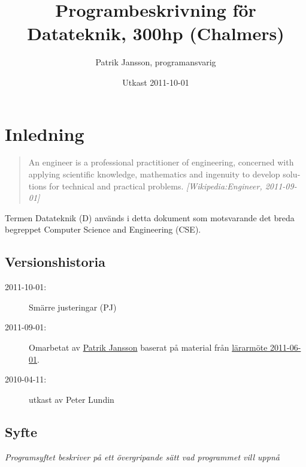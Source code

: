 \documentclass[twocolumn]{article}
\title{Programbeskrivning för Datateknik, 300hp (Chalmers)}
\author{Patrik Jansson, programansvarig}
\date{Utkast 2011-10-01}
\newcommand{\meta}[1]{{\small \emph{#1}}}
\begin{document}
\maketitle
\section{Inledning}

\begin{quote}
  \foreignlanguage{british}{An engineer is a professional practitioner
    of engineering, concerned with applying scientific knowledge,
    mathematics and ingenuity to develop solutions for technical and
    practical problems. \meta{[Wikipedia:Engineer, 2011-09-01]}}
\end{quote}

Termen Datateknik (D) används i detta dokument som motsvarande det
breda begreppet \foreignlanguage{british}{Computer Science and
  Engineering (CSE)}.

\subsection*{Versionshistoria}
{\small
\begin{description}
\item[2011-10-01:] Smärre justeringar (PJ)
\item[2011-09-01:] Omarbetat av \href{http://www.chalmers.se/cse/EN/people/jansson-patrik}{Patrik Jansson} baserat på material från 
\href{http://wiki.portal.chalmers.se/cse/pmwiki.php/PAD/L%C3%A4rarm%C3%B6teVT2011}{lärarmöte 2011-06-01}.
\item[2010-04-11:] utkast av Peter Lundin
\end{description}
}

\subsection{Syfte} 
\meta{Programsyftet beskriver på ett övergripande sätt vad programmet vill
uppnå}
\end{document}
